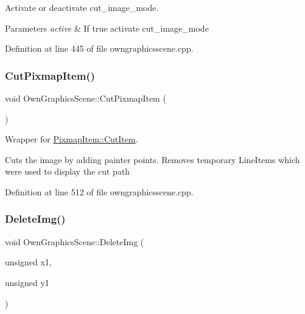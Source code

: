 Activate or deactivate cut\+\_\+image\+\_\+mode. 


\begin{DoxyParams}{Parameters}
{\em active} & If true activate cut\+\_\+image\+\_\+mode \\
\hline
\end{DoxyParams}


Definition at line 445 of file owngraphicsscene.\+cpp.

\mbox{\label{classOwnGraphicsScene_a7e3d97c27cca1df796b75cc4a99e24cd}} 
\subsubsection{\texorpdfstring{Cut\+Pixmap\+Item()}{CutPixmapItem()}}
{\footnotesize\ttfamily void Own\+Graphics\+Scene\+::\+Cut\+Pixmap\+Item (\begin{DoxyParamCaption}{ }\end{DoxyParamCaption})}



Wrapper for \mbox{\hyperlink{classPixmapItem_a4a742318dce01d018da2f4b01790c210}{Pixmap\+Item\+::\+Cut\+Item}}. 

Cuts the image by adding painter points. Removes temporary Line\+Items which were used to display the cut path 

Definition at line 512 of file owngraphicsscene.\+cpp.

\mbox{\label{classOwnGraphicsScene_abda962c04f88920377d3bb23b30b9267}} 
\subsubsection{\texorpdfstring{Delete\+Img()}{DeleteImg()}}
{\footnotesize\ttfamily void Own\+Graphics\+Scene\+::\+Delete\+Img (\begin{DoxyParamCaption}\item[{unsigned}]{x1,  }\item[{unsigned}]{y1 }\end{DoxyParamCaption})}



